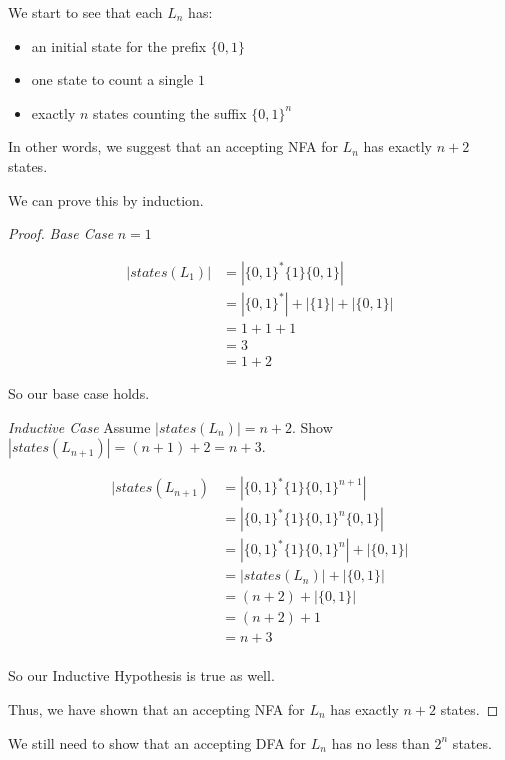 \documentclass[12pt,letterpaper]{article}
\begin{document}
\begin{enumerate}
      We start to see that each $L_n$ has:
      \begin{itemize}
        \item an initial state for the prefix $\{0,1\}$
        \item one state to count a single $1$
        \item exactly $n$ states counting the suffix $\{0,1\}^n$
      \end{itemize}

      In other words, we suggest that an accepting NFA for $L_n$ has exactly $n + 2$ states.

      We can prove this by induction.

      \begin{proof}
        \textit{Base Case} $n = 1$

        \begin{align*}
          |states(L_1)| &= |\{0,1\}^*\{1\}\{0,1\}| \\
          &= |\{0,1\}^*| + |\{1\}| + |\{0,1\}| \\
          &= 1 + 1 + 1 \\
          &= 3 \\
          &= 1 + 2
        \end{align*}

        So our base case holds.

        \textit{Inductive Case} Assume $|states(L_n)| = n + 2$. Show $|states(L_{n+1})| = (n + 1) + 2 = n + 3$.

        \begin{align*}
          |states(L_{n+1}) &= |\{0,1\}^*\{1\}\{0,1\}^{n+1}| \\
          &= |\{0,1\}^*\{1\}\{0,1\}^n\{0,1\}| \\
          &= |\{0,1\}^*\{1\}\{0,1\}^n| + |\{0,1\}| \\
          &= |states(L_n)| + |\{0,1\}| \\
          &= (n + 2) + |\{0,1\}| \\
          &= (n + 2) + 1 \\
          &= n + 3 \\
        \end{align*}

        So our Inductive Hypothesis is true as well.

        Thus, we have shown that an accepting NFA for $L_n$ has exactly $n + 2$ states.
      \end{proof}

      We still need to show that an accepting DFA for $L_n$ has no less than $2^n$ states.


\end{enumerate}
\end{document}
